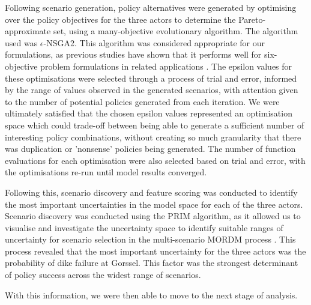Following scenario generation, policy alternatives were generated by optimising over the policy objectives for the three actors to determine the Pareto-approximate set, using a many-objective evolutionary algorithm. The algorithm used was $\epsilon$-NSGA2. This algorithm was considered appropriate for our formulations, as previous studies have shown that it performs well for six-objective problem formulations in related applications \parencite{salazar_diagnostic_2016}. The epsilon values for these optimisations were selected through a process of trial and error, informed by the range of values observed in the generated scenarios, with attention given to the number of potential policies generated from each iteration. We were ultimately satisfied that the chosen epsilon values represented an optimisation space which could trade-off between being able to generate a sufficient number of interesting policy combinations, without creating so much granularity that there was duplication or 'nonsense' policies being generated. The number of function evaluations for each optimisation were also selected based on trial and error, with the optimisations re-run until model results converged.

Following this, scenario discovery and feature scoring was conducted to identify the most important uncertainties in the model space for each of the three actors. Scenario discovery was conducted using the PRIM algorithm, as it allowed us to visualise and investigate the uncertainty space to identify suitable ranges of uncertainty for scenario selection in the multi-scenario MORDM process \parencite{bryant_thinking_2010}. This process revealed that the most important uncertainty for the three actors was the probability of dike failure at Gorssel. This factor was the strongest determinant of policy success across the widest range of scenarios.

With this information, we were then able to move to the next stage of analysis.

